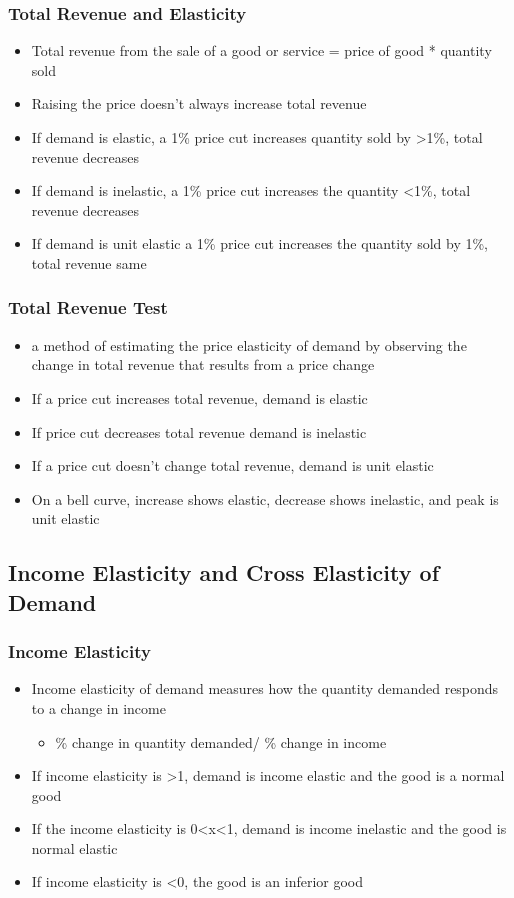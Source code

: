 \documentclass[11pt]{article}
\begin{document}
\subsubsection{Total Revenue and Elasticity}
\label{sec:orgfffb11f}
\begin{itemize}
\item Total revenue from the sale of a good or service = price of good * quantity sold
\item Raising the price doesn't always increase total revenue
\item If demand is elastic, a 1\% price cut increases quantity sold by >1\%, total revenue decreases
\item If demand is inelastic, a 1\% price cut increases the quantity <1\%, total revenue decreases
\item If demand is unit elastic a 1\% price cut increases the quantity sold by 1\%, total revenue same
\end{itemize}
\subsubsection{Total Revenue Test}
\label{sec:orgf93b4d6}
\begin{itemize}
\item a method of estimating the price elasticity of demand by
observing the change in total revenue that results from a price change
\item If a price cut increases total revenue, demand is elastic
\item If price cut decreases total revenue demand is inelastic
\item If a price cut doesn't change total revenue, demand is unit elastic
\item On a bell curve, increase shows elastic, decrease shows inelastic, and peak is unit elastic
\end{itemize}
\subsection{Income Elasticity and Cross Elasticity of Demand}
\label{sec:org7c8cd8b}
\subsubsection{Income Elasticity}
\label{sec:org7cd59b2}
\begin{itemize}
\item Income elasticity of demand measures how the quantity demanded responds to a change in income
\begin{itemize}
\item \% change in quantity demanded/ \% change in income
\end{itemize}
\item If income elasticity is >1, demand is income elastic and the good is a normal good
\item If the income elasticity is 0<x<1, demand is income inelastic and the good is normal elastic
\item If income elasticity is <0, the good is an inferior good
\end{itemize}
\end{document}
